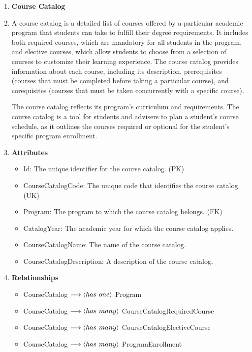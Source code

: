 \documentclass[12pt]{article}
\begin{document}
\begin{appendices}
\begin{enumerate}[label=(\roman*)]
    \item \textbf{Course Catalog}
    \item[] A course catalog is a detailed list of courses offered by a particular academic program that students can take to fulfill their degree requirements. It includes both required courses, which are mandatory for all students in the program, and elective courses, which allow students to choose from a selection of courses to customize their learning experience. The course catalog provides information about each course, including its description, prerequisites (courses that must be completed before taking a particular course), and corequisites (courses that must be taken concurrently with a specific course). 

    The course catalog reflects its program's curriculum and requirements. The course catalog is a tool for students and advisers to plan a student's course schedule, as it outlines the courses required or optional for the student's specific program enrollment.
    \item[] \textbf{Attributes}
    \begin{itemize}
        \item Id: The unique identifier for the course catalog. (PK)
        \item CourseCatalogCode: The unique code that identifies the course catalog. (UK)
        \item Program: The program to which the course catalog belongs. (FK)
        \item CatalogYear: The academic year for which the course catalog applies.
        \item CourseCatalogName: The name of the course catalog.
        \item CourseCatalogDescription: A description of the course catalog.
    \end{itemize}
    \item[] \textbf{Relationships}
    \begin{itemize}
        \item CourseCatalog $ \longrightarrow \langle has \hspace{0.125cm} one \rangle $ Program
        \item CourseCatalog $ \longrightarrow \langle has \hspace{0.125cm} many \rangle $ CourseCatalogRequiredCourse
        \item CourseCatalog $ \longrightarrow \langle has \hspace{0.125cm} many \rangle $ CourseCatalogElectiveCourse
        \item CourseCatalog $ \longrightarrow \langle has \hspace{0.125cm} many \rangle $ ProgramEnrollment
    \end{itemize}


\end{enumerate}
\end{appendices}
\end{document}
